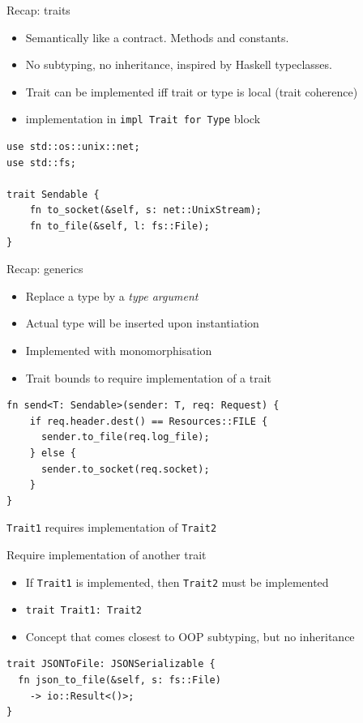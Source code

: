 \documentclass{beamer}
\begin{document}
\begin{frame}[fragile]{Recap: traits}
  \begin{itemize}
    \item Semantically like a contract. Methods and constants.
    \item No subtyping, no inheritance, inspired by Haskell typeclasses.
    \item Trait can be implemented iff trait or type is local (trait coherence)
    \item implementation in \texttt{impl Trait for Type} block
  \end{itemize}
  \begin{verbatim}
use std::os::unix::net;
use std::fs;

trait Sendable {
    fn to_socket(&self, s: net::UnixStream);
    fn to_file(&self, l: fs::File);
}
\end{verbatim}
\end{frame}

\begin{frame}[fragile]{Recap: generics}
  \begin{itemize}
    \item Replace a type by a \emph{type argument}
    \item Actual type will be inserted upon instantiation
    \item Implemented with monomorphisation
    \item Trait bounds to require implementation of a trait
  \end{itemize}
  \begin{verbatim}
fn send<T: Sendable>(sender: T, req: Request) {
    if req.header.dest() == Resources::FILE {
      sender.to_file(req.log_file);
    } else {
      sender.to_socket(req.socket);
    }
}
\end{verbatim}
\end{frame}

\begin{frame}[standout]
  \texttt{Trait1} requires implementation of \texttt{Trait2}
\end{frame}

\begin{frame}[fragile]{Require implementation of another trait}
  \begin{itemize}
    \item If \texttt{Trait1} is implemented, then \texttt{Trait2} must be implemented
    \item \texttt{trait Trait1: Trait2}
    \item Concept that comes closest to OOP subtyping, but no inheritance
  \end{itemize}
  \begin{verbatim}
trait JSONToFile: JSONSerializable {
  fn json_to_file(&self, s: fs::File)
    -> io::Result<()>;
}
\end{verbatim}
\end{frame}
\end{document}
